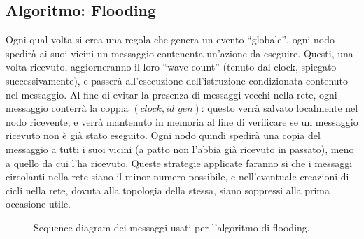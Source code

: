 \documentclass[italian]{memoir}
\begin{document}
\subsection{Algoritmo: Flooding} \label{alg:flooding}
Ogni qual volta si crea una regola che genera un evento ``globale'', ogni nodo spedirà
	   ai suoi vicini un messaggio contenenta un'azione da eseguire. Questi, una volta ricevuto,
	   aggiorneranno il loro ``wave count'' (tenuto dal clock, spiegato successivamente),
	   e passerà all'esecuzione dell'istruzione condizionata contenuto nel messaggio. Al
	   fine di evitar la presenza di messaggi vecchi nella rete, ogni messaggio conterrà
	   la coppia $(clock,id\_gen)$: questo verrà salvato localmente nel nodo ricevente,
	   e verrà mantenuto in memoria al fine di verificare se un messaggio ricevuto non
	   è già stato eseguito. Ogni nodo quindi spedirà una copia del messaggio a tutti
	   i suoi vicini (a patto non l'abbia già ricevuto in passato), meno a quello da cui
	   l'ha ricevuto. Queste strategie applicate faranno si che i messaggi circolanti nella
	   rete siano il minor numero possibile, e nell'eventuale creazioni di cicli nella rete,
	   dovuta alla topologia della stessa, siano soppressi alla prima occasione utile.

\begin{figure}[H]
\caption{Sequence diagram dei messaggi usati per l'algoritmo di flooding.}
\label{img:flooding}
\end{figure}
\end{document}
